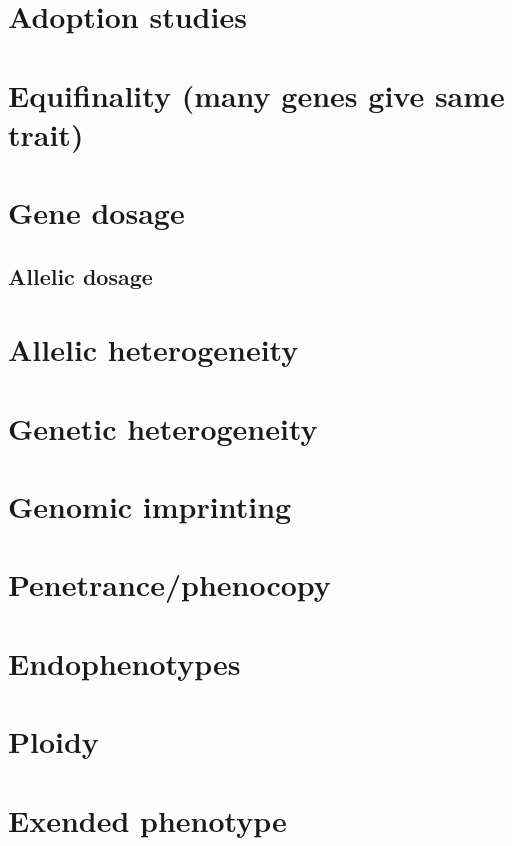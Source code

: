 \documentclass[]{book}
\theoremstyle{definition}
\theoremstyle{definition}
\theoremstyle{definition}
\theoremstyle{remark}
\begin{document}
\section{Adoption studies}\label{adoption-studies}

\section{Equifinality (many genes give same
trait)}\label{equifinality-many-genes-give-same-trait}

\section{Gene dosage}\label{gene-dosage}

\subsection{Allelic dosage}\label{allelic-dosage}

\section{Allelic heterogeneity}\label{allelic-heterogeneity}

\section{Genetic heterogeneity}\label{genetic-heterogeneity}

\section{Genomic imprinting}\label{genomic-imprinting}

\section{Penetrance/phenocopy}\label{penetrancephenocopy}

\section{Endophenotypes}\label{endophenotypes}

\section{Ploidy}\label{ploidy}

\section{Exended phenotype}\label{exended-phenotype}
\end{document}
